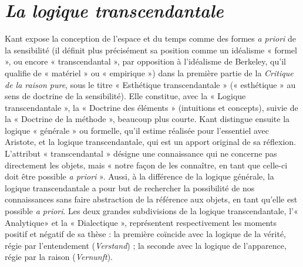 
\section{{\it La logique transcendantale}}

Kant expose la conception de l’espace
et du temps comme des formes {\it a priori} de
la sensibilité (il définit plus précisément
sa position comme un idéalisme « formel »,
ou encore « transcendantal », par
opposition à l’idéalisme de Berkeley, qu’il
qualifie de « matériel » ou « empirique »)
dans la première partie de la {\it Critique de
la raison pure}, sous le titre « Esthétique
transcendantale » (« esthétique » au sens
de doctrine de la sensibilité). Elle constitue,
avec la « Logique transcendantale »,
la « Doctrine des éléments » (intuitions et
concepts), suivie de la « Doctrine de la
méthode », beaucoup plus courte. Kant
distingue ensuite la logique « générale »
ou formelle, qu’il estime réalisée pour
l'essentiel avec Aristote, et la logique
transcendantale, qui est un apport original
de sa réflexion. L’attribut « transcendantal »
désigne une connaissance qui ne
concerne pas directement les objets, mais
« notre façon de les connaître, en tant que
celle-ci doit être possible {\it a priori} ». Aussi,
à la différence de la logique générale, la
logique transcendantale a pour but de
rechercher la possibilité de nos connaissances
sans faire abstraction de la référence
aux objets, en tant qu’elle est
possible {\it a priori}. Les deux grandes subdivisions
de la logique transcendantale,
l'« Analytique» et la « Dialectique »,
représentent respectivement les moments
positif et négatif de sa thèse : la première
coïncide avec la logique de la vérité, régie
par l’entendement ({\it Verstand}) ; la seconde
avec la logique de l'apparence, régie par
la raison ({\it Vernunft}).

